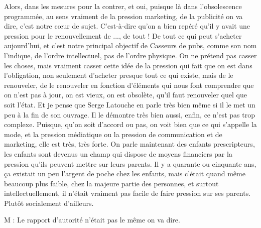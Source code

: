\begin{description}
Alors, dans les mesures pour la contrer, et oui, puisque là dans l'obsolescence programmée, au sens vraiment de la pression marketing, de la publicité on va dire, c'est notre cœur de sujet. C'est-à-dire qu'on a bien repéré qu'il y avait une pression pour le renouvellement de ..., de tout ! De tout ce qui peut s'acheter aujourd'hui, et c'est notre principal objectif de Casseurs de pubs, comme son nom l'indique, de l'ordre intellectuel, pas de l'ordre physique. On ne prétend pas casser les choses, mais vraiment casser cette idée de la pression qui fait que on est dans l'obligation, non seulement d'acheter presque tout ce qui existe, mais de le renouveler, de le renouveler en fonction d'éléments qui nous font comprendre que on n’est pas à jour, on est vieux, on est obsolète, qu'il faut renouveler quel que soit l'état.
Et je pense que Serge Latouche en parle très bien même si il le met un peu à la fin de son ouvrage. Il le démontre très bien aussi, enfin, ce n'est pas trop complexe. Puisque, qu'on soit d'accord ou pas, on voit bien que ce qui s'appelle la mode, et la pression médiatique ou la pression de communication et de marketing, elle est très, très forte. On parle maintenant des enfants prescripteurs, les enfants sont devenus un champ qui dispose de moyens financiers par la pression qu'ils peuvent mettre sur leurs parents. Il y a quarante ou cinquante ans, ça existait un peu l'argent de poche chez les enfants, mais c'était quand même beaucoup plus faible, chez la majeure partie des personnes, et surtout intellectuellement, il n'était vraiment pas facile de faire pression sur ses parents. Plutôt socialement d'ailleurs.

\vspace{1\baselineskip}

M : Le rapport d'autorité n'était pas le même on va dire.

\vspace{1\baselineskip}


\end{description}
